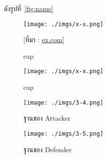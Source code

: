 ดังรูปที่~\ref{fig:name}


\begin{figure}[!h]\centering
    \setlength{\fboxrule}{0.2mm}
    \setlength{\fboxsep}{1cm}
    \fbox{}
    \texttt{[image: ./imgs/x-x.png]}
    \caption{cap}\label{fig:x-x}
    \small [ที่มา : \url{ex.com}]
\end{figure}

\begin{figure}[H]\centering
    \texttt{[image: ./imgs/x-x.png]}
    \caption{cap}\label{fig:x-x}
\end{figure}

\begin{figure}[H]\centering
    \begin{minipage}{.3\textwidth}
      \centering
      \texttt{[image: ./imgs/3-4.png]}
      \caption{ฐานของ Attacker}\label{fig:3-4}
    \end{minipage}
    \begin{minipage}{.3\textwidth}
      \centering
      \texttt{[image: ./imgs/3-5.png]}
      \caption{ฐานของ Defender}\label{fig:3-5}
    \end{minipage}
  \end{figure}

\chapter{}

\section{}

\subsection{}

\subsubsection{}